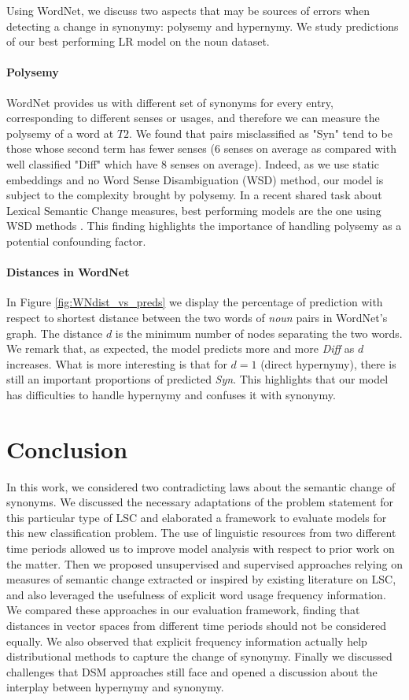 \documentclass[11pt]{article}
\begin{document}
Using WordNet, we discuss two aspects that may be sources of errors when detecting a change in synonymy: polysemy and hypernymy. We study predictions of our best performing LR model on the noun dataset.

\paragraph{Polysemy}
WordNet provides us with different set of synonyms for every entry, corresponding to different senses or usages, and therefore we can measure the polysemy of a word at $T2$. We found that pairs misclassified as "Syn" tend to be those whose second term has fewer senses (6 senses on average as compared with well classified "Diff" which have 8 senses on average). Indeed, as we use static embeddings and no Word Sense Disambiguation (WSD) method, our model is subject to the complexity brought by polysemy. In a recent shared task about Lexical Semantic Change measures, best performing models are the one using WSD methods \citep{d-zamora-reina-etal-2022-black}. This finding highlights the importance of handling polysemy as a potential confounding factor.

\paragraph{Distances in WordNet}
In Figure \ref{fig:WNdist_vs_preds} we display the percentage of prediction with respect to shortest distance between the two words of \textit{noun} pairs in WordNet's graph. The distance $d$ is the minimum number of nodes separating the two words. 
We remark that, as expected, the model predicts more and more \textit{Diff} as $d$ increases. What is more interesting is that for $d=1$ (direct hypernymy), there is still an important proportions of predicted \textit{Syn}. This highlights that our model has difficulties to handle hypernymy and confuses it with synonymy. 


\section{Conclusion}

 In this work, we considered two contradicting laws about the semantic change of synonyms. We discussed the necessary adaptations of the problem statement for this particular type of LSC and elaborated a framework to evaluate models for this new classification problem. The use of linguistic resources from two different time periods allowed us to improve model analysis with respect to prior work on the matter. Then we proposed unsupervised and supervised approaches relying on measures of semantic change extracted or inspired by existing literature on LSC, and also leveraged the usefulness of explicit word usage frequency information. We compared these approaches in our evaluation framework, finding that distances in vector spaces from different time periods should not be considered equally. We also observed that explicit frequency information actually help distributional methods to capture the change of synonymy. Finally we discussed challenges that DSM approaches still face and opened a discussion about the interplay between hypernymy and synonymy.
\end{document}
